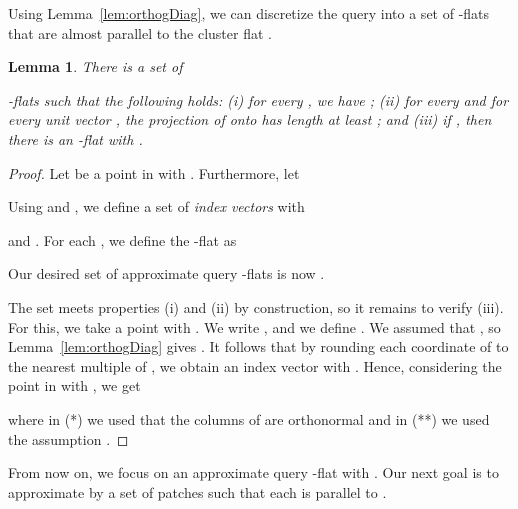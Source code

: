 \documentclass[a4paper,11pt]{paper}
\newtheorem{lemma}[theorem]{Lemma}
\begin{document}
Using Lemma~\ref{lem:orthogDiag}, we can discretize
the query  into a set of  -flats that are
almost parallel to the cluster flat .
\begin{lemma}\label{lem:tflats}
  There is a set   of
  
  -flats such
  that the following holds:
  (i) for every , we have
    ;
  (ii) for every  and for every unit vector
    , the projection
    of  onto  has length at least ; and
  (iii) if ,
  then there is an -flat  with
  .
\end{lemma}
\begin{proof}
  Let  be a point in  with
  .  Furthermore, let
  
  Using  and , we
  define a set  of \emph{index vectors} with
  
  and .
  For each , we define the -flat  as
  
  Our desired set of approximate query -flats is now .

  The set  meets properties (i) and (ii)
  by construction, so it remains to verify (iii).
  For this, we take a point  with .
  We write ,  and we define
  .
  We assumed that
  ,
  so Lemma~\ref{lem:orthogDiag} gives
  .
  It follows that by rounding each coordinate of  to
  the nearest multiple of ,
  we obtain an index vector  with
  .
  Hence, considering the point in  with ,
  we get
  
  where in (*) we used that the columns of
   are orthonormal and in (**) we used the
  assumption .
\end{proof}

From now on, we focus on an approximate query -flat
 with .
Our next goal is to approximate   by a set of patches such
that each is parallel to .
\end{document}

